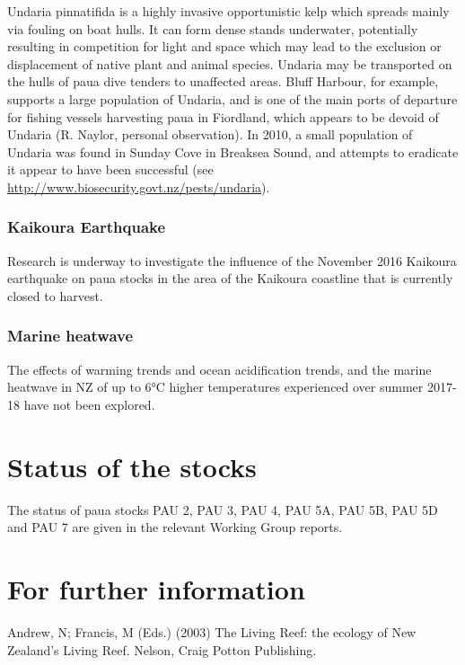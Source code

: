 \documentclass{mpi-plenary}
\theoremstyle{definition}
\theoremstyle{definition}
\theoremstyle{definition}
\theoremstyle{remark}
\begin{document}
Undaria pinnatifida is a highly invasive opportunistic kelp which
spreads mainly via fouling on boat hulls. It can form dense stands
underwater, potentially resulting in competition for light and space
which may lead to the exclusion or displacement of native plant and
animal species. Undaria may be transported on the hulls of paua dive
tenders to unaffected areas. Bluff Harbour, for example, supports a
large population of Undaria, and is one of the main ports of departure
for fishing vessels harvesting paua in Fiordland, which appears to be
devoid of Undaria (R. Naylor, personal observation). In 2010, a small
population of Undaria was found in Sunday Cove in Breaksea Sound, and
attempts to eradicate it appear to have been successful (see
\url{http://www.biosecurity.govt.nz/pests/undaria}).

\subsubsection{Kaikoura Earthquake}\label{kaikoura-earthquake}

Research is underway to investigate the influence of the November 2016
Kaikoura earthquake on paua stocks in the area of the Kaikoura coastline
that is currently closed to harvest.

\subsubsection{Marine heatwave}\label{marine-heatwave}

The effects of warming trends and ocean acidification trends, and the
marine heatwave in NZ of up to 6°C higher temperatures experienced over
summer 2017-18 have not been explored.

\section{Status of the stocks}\label{status-of-the-stocks}

The status of paua stocks PAU 2, PAU 3, PAU 4, PAU 5A, PAU 5B, PAU 5D
and PAU 7 are given in the relevant Working Group reports.

\section{For further information}\label{for-further-information}

Andrew, N; Francis, M (Eds.) (2003) The Living Reef: the ecology of New
Zealand's Living Reef. Nelson, Craig Potton Publishing.
\end{document}
